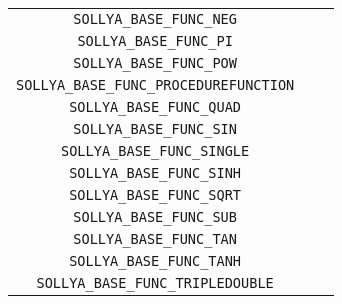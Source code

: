 \documentclass[a4paper]{article}
\begin{document}
\begin{table}[htp]
\begin{center}
\begin{tabular}{|c|l|l|}
  \verb|SOLLYA_BASE_FUNC_NEG| \\
  \verb|SOLLYA_BASE_FUNC_PI| \\
  \verb|SOLLYA_BASE_FUNC_POW| \\
  \verb|SOLLYA_BASE_FUNC_PROCEDUREFUNCTION| \\
  \verb|SOLLYA_BASE_FUNC_QUAD| \\
  \verb|SOLLYA_BASE_FUNC_SIN| \\
  \verb|SOLLYA_BASE_FUNC_SINGLE| \\
  \verb|SOLLYA_BASE_FUNC_SINH| \\
  \verb|SOLLYA_BASE_FUNC_SQRT| \\
  \verb|SOLLYA_BASE_FUNC_SUB| \\
  \verb|SOLLYA_BASE_FUNC_TAN| \\
  \verb|SOLLYA_BASE_FUNC_TANH| \\
  \verb|SOLLYA_BASE_FUNC_TRIPLEDOUBLE| \\
\hline
  \end{tabular}
\end{center}
\end{table}
\end{document}
